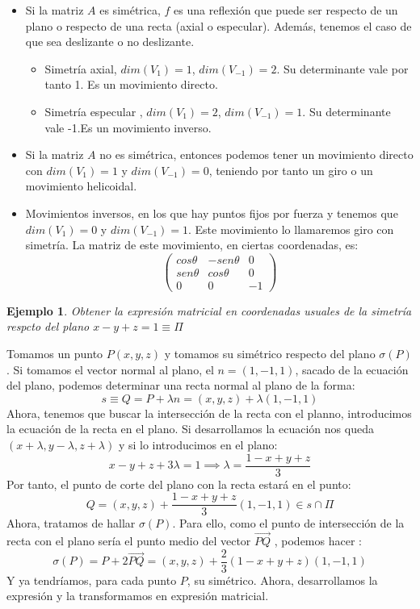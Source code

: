 \documentclass[11pt, a4paper, titlepage]{article}
\makeatletter
\renewenvironment{proof}[1][\proofname] {\vspace{-15pt}\par\pushQED{\qed}\normalfont\topsep6\p@\@plus6\p@\relax\trivlist\item[\hskip\labelsep\it#1\@addpunct{.}]\ignorespaces}{\popQED\endtrivlist\@endpefalse}
\renewcommand{\vec}{\overrightarrow}
\renewenvironment{proof}[1][\proofname] {\par\pushQED{\qed}\normalfont\topsep6\p@\@plus6\p@\relax\trivlist\item[\hskip\labelsep\itshape\sffamily#1\@addpunct{.}]\ignorespaces}{\popQED\endtrivlist\@endpefalse}
\theoremstyle{theorem-style}
\theoremstyle{definition-style}
\theoremstyle{remark-style}
\theoremstyle{example-style}
\newtheorem{ejemplo}{Ejemplo}[section]
\makeatother
\begin{document}
\begin{itemize}
\item Si la matriz $A$ es simétrica, $f$ es una reflexión que puede ser respecto de un plano o respecto de una recta (axial o especular). Además, tenemos el caso de que sea deslizante o no deslizante.

  \begin{itemize}
  \item Simetría axial, $dim(V_1) = 1$, $dim(V_{-1}) =2$. Su determinante vale por tanto 1. Es un movimiento directo.
  \item Simetría especular , $dim(V_1) = 2$, $dim(V_{-1}) =1$. Su determinante vale -1.Es un movimiento inverso.
  \end{itemize}

\item Si la matriz $A$ no es simétrica, entonces podemos tener un movimiento directo con $dim(V_1) = 1$ y $dim(V_{-1})=0$, teniendo por tanto un giro o un movimiento helicoidal.
  
\item Movimientos inversos, en los que hay puntos fijos por fuerza y tenemos que $dim(V_1) = 0$ y $dim(V_{-1}) = 1$. Este movimiento lo llamaremos giro con simetría. La matriz de este movimiento, en ciertas coordenadas, es:
  \[
    \begin{pmatrix}
      cos \theta & -sen\theta  & 0\\
      sen\theta & cos\theta  & 0\\
      0 & 0 & -1
    \end{pmatrix} 
  \]
\end{itemize}

\begin{ejemplo}
  Obtener la expresión matricial en coordenadas usuales de la simetría respcto del plano $x-y+z = 1\equiv \Pi$
\end{ejemplo}
\begin{proof}[Solución:]
  Tomamos un punto $P(x,y,z)$ y tomamos su simétrico respecto del plano $\sigma(P)$. Si tomamos el vector normal al plano, el $n=(1,-1,1)$, sacado de la ecuación del plano, podemos determinar una recta normal al plano de la forma:
  \[
    s\equiv Q = P + \lambda n = (x,y,z)+\lambda(1,-1,1)
  \]
  Ahora, tenemos que buscar la intersección de la recta con el planno, introducimos la ecuación de la recta en el plano. Si desarrollamos la ecuación nos queda $(x+\lambda,y-\lambda,z+\lambda)$ y si lo introducimos en el plano:
  \[
    x-y+z+3\lambda = 1 \implies \lambda = \frac{1-x+y+z}{3}
  \]
  Por tanto, el punto de corte del plano con la recta estará en el punto:
  \[
    Q = (x,y,z)+\frac{1-x+y+z}{3}(1,-1,1) \in s\cap \Pi
  \]
  Ahora, tratamos de hallar $\sigma(P)$. Para ello, como el punto de intersección de la recta con el plano sería el punto medio del vector $\vec{PQ}$ , podemos hacer :
  \[
    \sigma(P) = P + 2 \vec{PQ} = (x,y,z) + \dfrac{2}{3}(1-x+y+z)(1,-1,1)
  \]
  Y ya tendríamos, para cada punto $P$, su simétrico. Ahora, desarrollamos la expresión y la transformamos en expresión matricial.
\end{proof}
\end{document}

